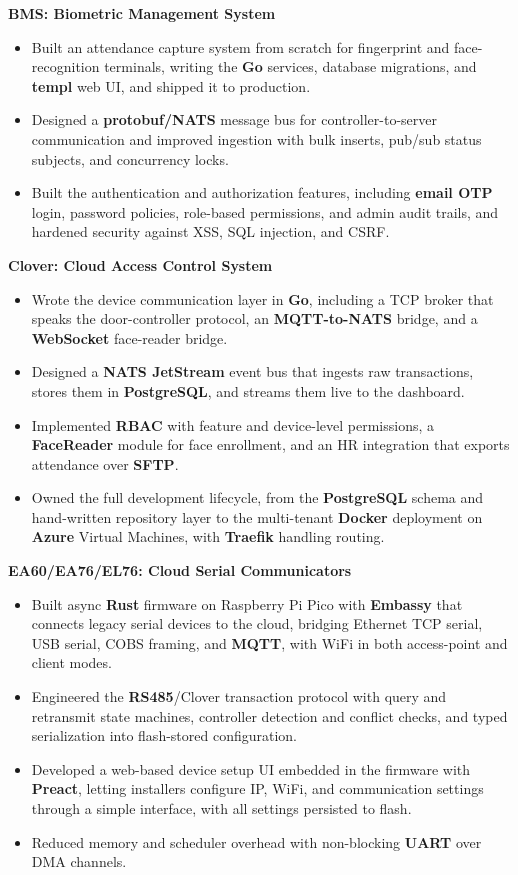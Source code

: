 \documentclass[11pt]{article}
\begin{document}
\textbf{BMS: Biometric Management System}

\begin{itemize}
  \item Built an attendance capture system from scratch for fingerprint and face-recognition terminals, writing the \textbf{Go} services, database migrations, and \textbf{templ} web UI, and shipped it to production.
  \item Designed a \textbf{protobuf/NATS} message bus for controller-to-server communication and improved ingestion with bulk inserts, pub/sub status subjects, and concurrency locks.
  \item Built the authentication and authorization features, including \textbf{email OTP} login, password policies, role-based permissions, and admin audit trails, and hardened security against XSS, SQL injection, and CSRF.
\end{itemize}

\textbf{Clover: Cloud Access Control System}

\begin{itemize}
  \item Wrote the device communication layer in \textbf{Go}, including a TCP broker that speaks the door-controller protocol, an \textbf{MQTT-to-NATS} bridge, and a \textbf{WebSocket} face-reader bridge.
  \item Designed a \textbf{NATS JetStream} event bus that ingests raw transactions, stores them in \textbf{PostgreSQL}, and streams them live to the dashboard.
  \item Implemented \textbf{RBAC} with feature and device-level permissions, a \textbf{FaceReader} module for face enrollment, and an HR integration that exports attendance over \textbf{SFTP}.
  \item Owned the full development lifecycle, from the \textbf{PostgreSQL} schema and hand-written repository layer to the multi-tenant \textbf{Docker} deployment on \textbf{Azure} Virtual Machines, with \textbf{Traefik} handling routing.
\end{itemize}

\textbf{EA60/EA76/EL76: Cloud Serial Communicators}

\begin{itemize}
  \item Built async \textbf{Rust} firmware on Raspberry Pi Pico with \textbf{Embassy} that connects legacy serial devices to the cloud, bridging Ethernet TCP serial, USB serial, COBS framing, and \textbf{MQTT}, with WiFi in both access-point and client modes.
  \item Engineered the \textbf{RS485}/Clover transaction protocol with query and retransmit state machines, controller detection and conflict checks, and typed serialization into flash-stored configuration.
  \item Developed a web-based device setup UI embedded in the firmware with \textbf{Preact}, letting installers configure IP, WiFi, and communication settings through a simple interface, with all settings persisted to flash.
  \item Reduced memory and scheduler overhead with non-blocking \textbf{UART} over DMA channels.
\end{itemize}
\end{document}

